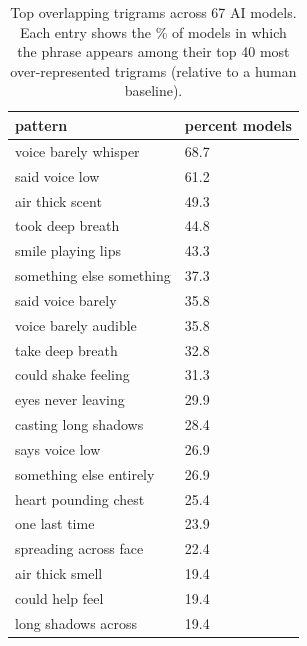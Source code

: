 \documentclass[11pt]{article}
\begin{document}
\begin{table}[ht]
\centering
\begin{tabular}{ll}
\hline
\textbf{pattern} & \textbf{percent models} \\
\hline
voice barely whisper & 68.7 \\
said voice low & 61.2 \\
air thick scent & 49.3 \\
took deep breath & 44.8 \\
smile playing lips & 43.3 \\
something else something & 37.3 \\
said voice barely & 35.8 \\
voice barely audible & 35.8 \\
take deep breath & 32.8 \\
could shake feeling & 31.3 \\
eyes never leaving & 29.9 \\
casting long shadows & 28.4 \\
says voice low & 26.9 \\
something else entirely & 26.9 \\
heart pounding chest & 25.4 \\
one last time & 23.9 \\
spreading across face & 22.4 \\
air thick smell & 19.4 \\
could help feel & 19.4 \\
long shadows across & 19.4 \\
\hline
\end{tabular}
\caption{Top overlapping trigrams across 67 AI models. Each entry shows the \% of models in which the phrase appears among their top 40 most over-represented trigrams (relative to a human baseline).}
\label{tab:ai_overlap_trigrams}
\end{table}

\clearpage
\end{document}
